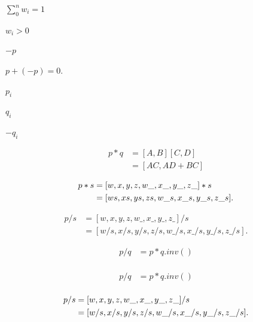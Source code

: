 \documentclass{article}
\begin{document}
$\sum_0^n w_{i} = 1$
\pagebreak

$w_i>0$
\pagebreak

$-p$
\pagebreak

$p + (-p) = 0.$
\pagebreak

$p_i$
\pagebreak

$q_i$
\pagebreak

$-q_i$
\pagebreak

\[       \begin{equation}
       \begin{split}
       p * q &= [A, B][C, D]\\
       &=[AC, AD + BC]
       \end{split}
       \end{equation}
\]
\pagebreak

\[       \begin{equation}
       \begin{split}
       p * s &= [w, x, y, z, w\_, x\_, y\_, z\_] * s\\
        &=[w   s, x   s, y   s, z   s, w\_  \space  s, x\_  \space  s, y\_ \space  s, z\_ \space  s].
       \end{split}
       \end{equation}
\]
\pagebreak

\[       \begin{equation}
       \begin{split}
       p / s &= [w, x, y, z, w\_, x\_, y\_, z\_] / s\\
       &=[w/s, x/s, y/s, z/s, w\_/s, x\_/s, y\_/s, z\_/s].
       \end{split}
       \end{equation}
\]
\pagebreak

\[       \begin{equation}
       \begin{split}
       p / q &= p * q.inv()\\
       \end{split}
       \end{equation}
\]
\pagebreak

\[       \begin{equation}
       \begin{split}
       p / q&= p * q.inv()\\
       \end{split}
       \end{equation}
\]
\pagebreak

\[       \begin{equation}
       \begin{split}
       p / s &= [w, x, y, z, w\_, x\_, y\_ ,z\_] / s\\
       &=[w / s, x / s, y / s, z / s, w\_ / \space s, x\_ / \space s, y\_ / \space s, z\_ / \space s].
       \end{split}
       \end{equation}
\]
\pagebreak
\end{document}
